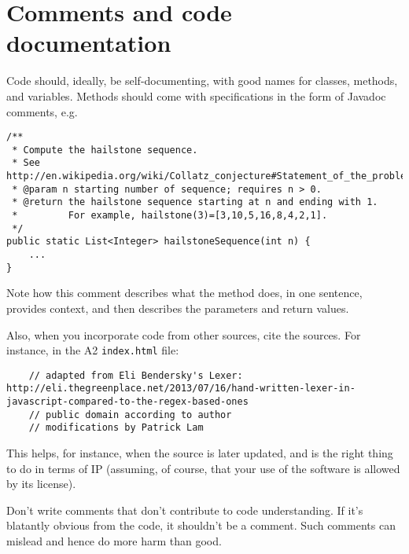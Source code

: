 \documentclass[11pt]{article}
\begin{document}
\section*{Comments and code documentation}
Code should, ideally, be self-documenting, with good names for
classes, methods, and variables. Methods should come with
specifications in the form of Javadoc comments, e.g.

{\small
\begin{lstlisting}
/**
 * Compute the hailstone sequence.
 * See http://en.wikipedia.org/wiki/Collatz_conjecture#Statement_of_the_problem
 * @param n starting number of sequence; requires n > 0.
 * @return the hailstone sequence starting at n and ending with 1.
 *         For example, hailstone(3)=[3,10,5,16,8,4,2,1].
 */
public static List<Integer> hailstoneSequence(int n) {
    ...
}
\end{lstlisting}
}

Note how this comment describes what the method does, in one sentence,
provides context, and then describes the parameters and return values.

Also, when you incorporate code from other sources, cite the sources.
For instance, in the A2 {\tt index.html} file:
\begin{lstlisting}
    // adapted from Eli Bendersky's Lexer: http://eli.thegreenplace.net/2013/07/16/hand-written-lexer-in-javascript-compared-to-the-regex-based-ones
    // public domain according to author
    // modifications by Patrick Lam
\end{lstlisting}
This helps, for instance, when the source is later updated, and is the
right thing to do in terms of IP (assuming, of course, that your use of
the software is allowed by its license).

Don't write comments that don't contribute to code understanding.
If it's blatantly obvious from the code, it shouldn't be a comment.
Such comments can mislead and hence do more harm than good.
\end{document}
